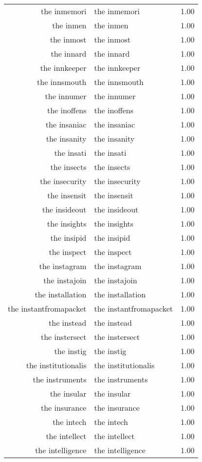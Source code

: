 \begin{table}[ht]
\begin{tabular}{rlr}
  the inmemori & the inmemori & 1.00 \\ 
  the inmen & the inmen & 1.00 \\ 
  the inmost & the inmost & 1.00 \\ 
  the innard & the innard & 1.00 \\ 
  the innkeeper & the innkeeper & 1.00 \\ 
  the innsmouth & the innsmouth & 1.00 \\ 
  the innumer & the innumer & 1.00 \\ 
  the inoffens & the inoffens & 1.00 \\ 
  the insaniac & the insaniac & 1.00 \\ 
  the insanity & the insanity & 1.00 \\ 
  the insati & the insati & 1.00 \\ 
  the insects & the insects & 1.00 \\ 
  the insecurity & the insecurity & 1.00 \\ 
  the insensit & the insensit & 1.00 \\ 
  the insideout & the insideout & 1.00 \\ 
  the insights & the insights & 1.00 \\ 
  the insipid & the insipid & 1.00 \\ 
  the inspect & the inspect & 1.00 \\ 
  the instagram & the instagram & 1.00 \\ 
  the instajoin & the instajoin & 1.00 \\ 
  the installation & the installation & 1.00 \\ 
  the instantfromapacket & the instantfromapacket & 1.00 \\ 
  the instead & the instead & 1.00 \\ 
  the instersect & the instersect & 1.00 \\ 
  the instig & the instig & 1.00 \\ 
  the institutionalis & the institutionalis & 1.00 \\ 
  the instruments & the instruments & 1.00 \\ 
  the insular & the insular & 1.00 \\ 
  the insurance & the insurance & 1.00 \\ 
  the intech & the intech & 1.00 \\ 
  the intellect & the intellect & 1.00 \\ 
  the intelligence & the intelligence & 1.00 \\ 

\end{tabular}
\end{table}
